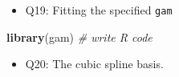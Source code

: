 \documentclass[]{article}
\newenvironment{Shaded}{\begin{snugshade}}{\end{snugshade}}
\newcommand{\KeywordTok}[1]{\textcolor[rgb]{0.13,0.29,0.53}{\textbf{#1}}}
\newcommand{\CommentTok}[1]{\textcolor[rgb]{0.56,0.35,0.01}{\textit{#1}}}
\newcommand{\NormalTok}[1]{#1}
\providecommand{\tightlist}{%
  \setlength{\itemsep}{0pt}\setlength{\parskip}{0pt}}
\begin{document}
\begin{itemize}
\tightlist
\item
  Q19: Fitting the specified \texttt{gam}
\end{itemize}

\begin{Shaded}
\begin{Highlighting}[]
\KeywordTok{library}\NormalTok{(gam)}
\CommentTok{# write R code}
\end{Highlighting}
\end{Shaded}

\begin{itemize}
\tightlist
\item
  Q20: The cubic spline basis.
\end{itemize}
\end{document}
